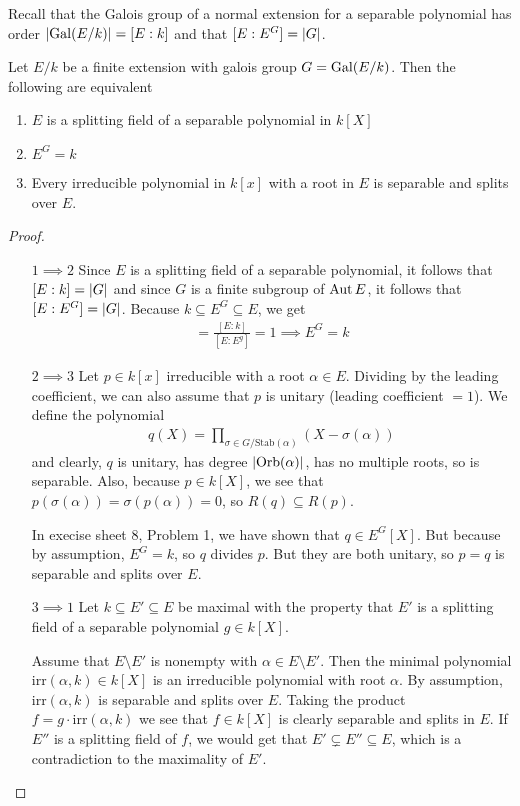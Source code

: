 Recall that the Galois group of a normal extension for a separable polynomial has order $\abs{\Gal(E/k)} = [E:k]$
and that $[E:E^{G}] = \vert G\vert$.


\begin{thm}[]\label{thm:4-11}
  Let $E/k$ be a finite extension with galois group $G = \operatorname{Gal}(E/k)$. Then the following are equivalent
  \begin{enumerate}
    \item $E$ is a splitting field of a separable polynomial in $k[X]$
    \item $E^{G} = k$
    \item Every irreducible polynomial in $k[x]$ with a root in $E$ is separable and splits over $E$.
  \end{enumerate}
\end{thm}
\begin{proof}
\begin{itemize}
  \item[$1 \implies 2$] Since $E$ is a splitting field of a separable polynomial, it follows that $[E:k] = \vert G\vert$ and
    since $G$ is a finite subgroup of $\operatorname{Aut} E$, it follows that $[E:E^{G}] = \vert G\vert$. 
    Because $k \subseteq E^{G} \subseteq E$, we get
    \begin{align*}
      [E^{G}:k] = \frac{[E:k]}{[E:E^{g}]} = 1 \implies E^{G} = k
    \end{align*}
  \item[$2 \implies 3$] Let $p \in k[x]$ irreducible with a root $\alpha \in E$.
    Dividing by the leading coefficient, we can also assume that $p$ is unitary (leading coefficient $= 1$).
    We define the polynomial
    \begin{align*}
      q(X) = \prod_{\sigma \in G/\text{Stab}(\alpha)}(X - \sigma(\alpha))
    \end{align*}
    and clearly, $q$ is unitary, has degree $\vert\text{Orb}(\alpha)\vert$, has no multiple roots, so is separable.
    Also, because $p \in k[X]$, we see that $p(\sigma(\alpha)) = \sigma(p(\alpha)) = 0$, so $R(q) \subseteq R(p)$.

    In execise sheet 8, Problem 1, we have shown that $q \in E^{G}[X]$.
    But because by assumption, $E^{G} = k$, so $q$ divides $p$. But they are both unitary, so $p = q$ is separable and splits over $E$.
  \item[$3 \implies 1$] Let $k \subseteq E' \subseteq E$ be maximal with the property that $E'$ is a splitting field of a separable polynomial $g \in k[X]$.

    Assume that $E \setminus E'$ is nonempty with $\alpha \in E \setminus E'$. 
    Then the minimal polynomial $\text{irr}(\alpha,k) \in k[X]$ is an irreducible polynomial with root $\alpha$.
    By assumption, $\text{irr}(\alpha,k)$ is separable and splits over $E$. Taking the product 
    $f = g \cdot \text{irr}(\alpha,k)$ we see that $f \in k[X]$ is clearly separable and splits in $E$.
    If $E''$ is a splitting field of $f$, we would get that $E' \subsetneq E'' \subseteq E$, which is a contradiction to the maximality of $E'$.
\end{itemize}
\end{proof}



